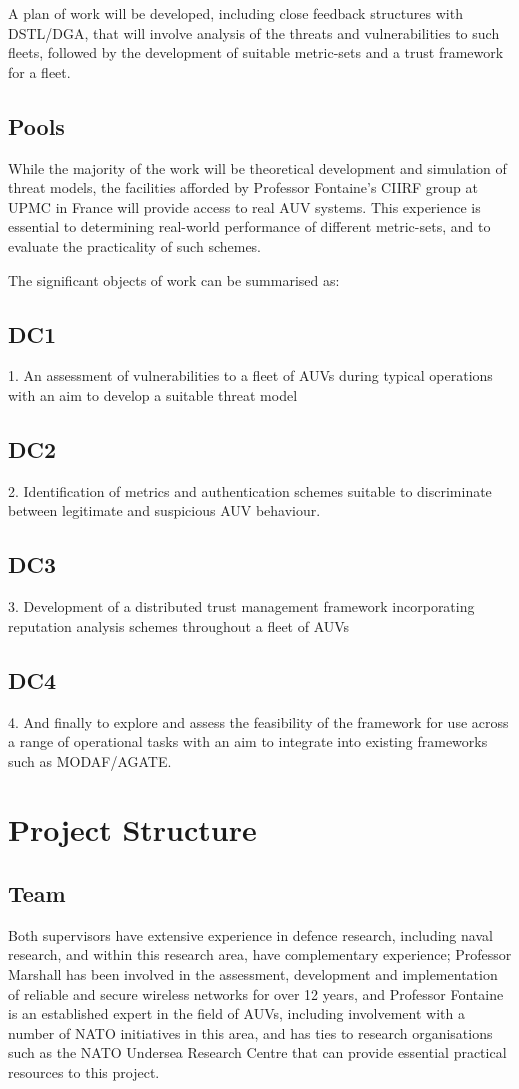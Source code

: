 \documentclass[oneside,9pt,a4paper]{Latex/Classes/PhDthesisPSnPDF}
\begin{document}
A plan of work will be developed, including close feedback structures with
DSTL/DGA, that will involve analysis of the threats and vulnerabilities to such
fleets, followed by the development of suitable metric-sets and a trust
framework for a fleet.

\subsection{Pools}  While the majority of the work will be theoretical development and
simulation of threat models, the facilities afforded by Professor Fontaine's
CIIRF group at UPMC in France will provide access to real AUV systems. This
experience is essential to determining real-world performance of different
metric-sets, and to evaluate the practicality of such schemes.

The significant objects of work can be summarised as:\subsection{DC1}  1. An assessment
of vulnerabilities to a fleet of AUVs during typical operations with an aim to
develop a suitable threat model \subsection{DC2}  2. Identification of metrics and
authentication schemes suitable to discriminate between legitimate and
suspicious AUV behaviour.\subsection{DC3}  3. Development of a distributed trust
management framework incorporating reputation analysis schemes throughout a
fleet of AUVs \subsection{DC4}  4. And finally to explore and assess the feasibility of
the framework for use across a range of operational tasks with an aim to
integrate into existing frameworks such as MODAF/AGATE.


\section{Project Structure}  
\subsection{Team}
Both supervisors have extensive experience in defence
research, including naval research, and within this research area, have complementary
experience; Professor Marshall has been involved in the assessment, development
and implementation of reliable and secure wireless networks for over 12 years,
and Professor Fontaine is an established expert in the field of AUVs, including
involvement with a number of NATO initiatives in this area, and has ties to
research organisations such as the NATO Undersea Research Centre that can
provide essential practical resources to this project.
\end{document}
